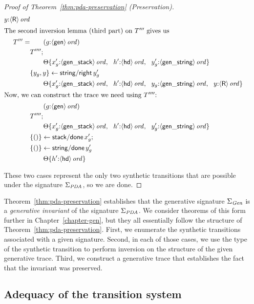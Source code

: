 \begin{proof}[Proof of Theorem~\ref{thm:pda-preservation} (Preservation)]
\begin{align*}
{                   y{:}{\langle {\sf R} \rangle}\,{{\it ord}}}\\
\intertext{The second inversion lemma (third part) on $T'''$ gives us}
T''' = & \qquad ({g{:}{\langle {\sf gen} \rangle}\,{{\it ord}}})\\
& T'''';\\
& \qquad {\Theta}\{{x_g'{:}{\langle {\sf gen\_stack} \rangle}\,{{\it ord}}, ~~
                   h'{:}{\langle {\sf hd} \rangle}\,{{\it ord}}, ~~
                   y_g'{:}{\langle {\sf gen\_string} \rangle}\,{{\it ord}}}\}\\
& \{{y_g, y}\} \leftarrow {{\sf string/right}\,y_g'}\\
& \qquad {\Theta}\{{x_g'{:}{\langle {\sf gen\_stack} \rangle}\,{{\it ord}}, ~~
                   h'{:}{\langle {\sf hd} \rangle}\,{{\it ord}}, ~~
                   y_g{:}{\langle {\sf gen\_string} \rangle}\,{{\it ord}}, ~~
                   y{:}{\langle {\sf R} \rangle}\,{{\it ord}}}\}\\
\intertext{Now, we can construct the trace we need using $T''''$:}
& \qquad ({g{:}{\langle {\sf gen} \rangle}\,{{\it ord}}})\\
& T'''';\\
& \qquad {\Theta}\{{x_g'{:}{\langle {\sf gen\_stack} \rangle}\,{{\it ord}}, ~~
                   h'{:}{\langle {\sf hd} \rangle}\,{{\it ord}}, ~~
                   y_g'{:}{\langle {\sf gen\_string} \rangle}\,{{\it ord}}}\}\\
& \{{()}\} \leftarrow {{\sf stack/done}\,x_g'};\\
& \{{()}\} \leftarrow {{\sf string/done}\,y_g'}\\
& \qquad {\Theta}\{{h'{:}{\langle {\sf hd} \rangle}\,{{\it ord}}}\}
\end{align*}

\noindent
These two cases represent the only two synthetic transitions that are possible
under the signature $\Sigma_{\it PDA}$, so we are done.
\end{proof}

Theorem~\ref{thm:pda-preservation} establishes that the generative
signature $\Sigma_{\it Gen}$ is a {\it generative invariant} of the
signature $\Sigma_{\it PDA}$. We consider theorems of this form
further in Chapter~\ref{chapter-gen}, but they all essentially follow
the structure of Theorem~\ref{thm:pda-preservation}. First, we
enumerate the synthetic transitions associated with a given
signature. Second, in each of those cases, we use the type of the
synthetic transition to perform inversion on the structure of the
given generative trace.  Third, we construct a generative trace that
establishes the fact that the invariant was preserved.

\subsection{Adequacy of the transition system}
\label{sec:pda-adequacy}

